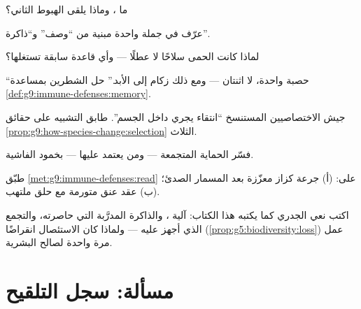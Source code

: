 \begin{exercise}[$\star$]\label{exo:g9:immune-defenses:5}
ما ، وماذا يلقى الهبوط الثاني؟
\end{exercise}

\begin{exercise}[$\star$]\label{exo:g9:immune-defenses:6}
عرّف  في جملة واحدة مبنية من ``وصف'' و``ذاكرة''.
\end{exercise}

\begin{exercise}[$\star\star$]\label{exo:g9:immune-defenses:7}
لماذا كانت الحمى سلاحًا لا عطلًا --- وأي قاعدة 
سابقة تستغلها؟
\end{exercise}

\begin{exercise}[$\star\star$]\label{exo:g9:immune-defenses:8}
``حصبة واحدة، لا اثنتان --- ومع ذلك زكام إلى الأبد.''
حل الشطرين بمساعدة \cref{def:g9:immune-defenses:memory}.
\end{exercise}

\begin{exercise}[$\star\star$]\label{exo:g9:immune-defenses:9}
جيش الاختصاصيين المستنسخ ``انتقاء يجري داخل الجسم''.
طابق التشبيه على حقائق
\cref{prop:g9:how-species-change:selection} الثلاث.
\end{exercise}

\begin{exercise}[$\star\star$]\label{exo:g9:immune-defenses:10}
فسّر الحماية المتجمعة --- ومن يعتمد عليها --- بخمود
الفاشية.
\end{exercise}

\begin{exercise}[$\star\star$]\label{exo:g9:immune-defenses:11}
طبّق \cref{met:g9:immune-defenses:read} على: (أ) جرعة
كزاز معزّزة بعد المسمار الصدئ؛ (ب) عقد عنق متورمة مع
حلق ملتهب.
\end{exercise}

\begin{exercise}[$\star\star\star$]\label{exo:g9:immune-defenses:12}
اكتب نعي الجدري كما يكتبه هذا الكتاب: آلية ،
والذاكرة المدرَّبة التي حاصرته، والتجمع الذي أجهز عليه
--- ولماذا كان الاستئصال انقراضًا
(\cref{prop:g5:biodiversity:loss}) عمل مرة واحدة لصالح
البشرية.
\end{exercise}

\section{مسألة: سجل التلقيح}

